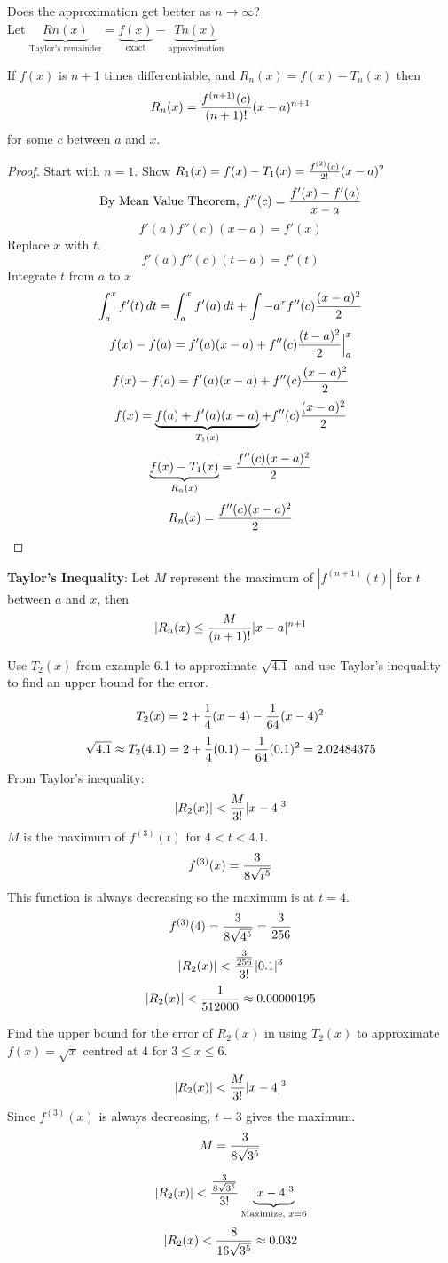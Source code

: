 \documentclass[english, 12pt]{article}
\begin{document}
\begin{asd}
Does the approximation get better as $n \to \infty$?\\
Let $\underbrace{Rn(x)}_{\text{Taylor's remainder}} = \underbrace{f(x)}_{\text{exact}} - \underbrace{Tn(x)}_{\text{approximation}}$
\begin{thrm}
If $f(x)$ is $n+1$ times differentiable, and 
$R_{n} (x) = f(x) - T_{n} (x)$ then
\[ R_{n} (x) = \frac{f^{(n+1)} (c)}{(n+1)!} (x-a)^{n+1}\]
for some $c$ between $a$ and $x$.
\begin{proof}
Start with $n=1$. Show $R_{1} (x) = f(x) - T_{1} (x) = \frac{f^{(2)} (c)}{2!} (x-a)^2$
\[\text{By Mean Value Theorem, } f''(c) = \frac{f'(x) - f'(a)}{x-a}\]
\[f'(a) f''(c) (x-a) = f'(x)\]
Replace $x$ with $t$.
\[f'(a) f''(c) (t-a) = f'(t)\]
Integrate $t$ from $a$ to $x$
\[\int_a^x f'(t)\,dt = \int_a^x f'(a)\,dt + \int-a^x f''(c) \frac{(x-a)^2}{2}\]
\[f(x) - f(a) = f'(a) (x-a) + f''(c) \frac{(t-a)^2}{2} \Big|_a^x\]
\[f(x) - f(a) = f'(a)(x-a) + f''(c) \frac{(x-a)^2}{2}\]
\[f(x) = \underbrace{f(a) + f'(a)(x-a)}_{T_{1} (x)} + f''(c) \frac{(x-a)^2}{2}\]
\[ \underbrace{f(x) - T_{1} (x)}_{R_{n} (x)} = \frac{f''(c) (x-a)^2}{2}\]
\[ R_{n} (x) = \frac{f''(c) (x-a)^2}{2}\]
\end{proof}
\end{thrm}
\end{asd}
\begin{thrm}
\textbf{Taylor's Inequality}: Let $M$ represent the maximum of $|f^{(n+1)} (t) |$ for $t$ between $a$ and $x$, then
\[|R_{n} (x) \leq \frac{M}{(n+1)!} |x-a|^{n+1}\]
\end{thrm}
\begin{exmp}
Use $T_{2} (x)$ from example 6.1 to approximate $\sqrt{4.1}$ and use Taylor's inequality to find an upper bound for the error.
\begin{sol}
\[T_{2} (x) = 2 + \frac{1}{4} (x-4) - \frac{1}{64} (x-4)^2\]
\[ \sqrt{4.1} \approx T_{2} (4.1) =  2 + \frac{1}{4} (0.1) - \frac{1}{64} (0.1)^2 = 2.02484375\]
From Taylor's inequality:
\[ |R_{2} (x) | < \frac{M}{3!} |x-4|^3\]
$M$ is the maximum of $f^{(3)} (t)$ for $ 4 < t < 4.1$.
\[ f^{(3)} (x) = \frac{3}{8 \sqrt{t^5}}\]
This function is always decreasing so the maximum is at $t = 4$.
\[f^{(3)} (4) = \frac{3}{8\sqrt{4^5}} = \frac{3}{256}\]
\[|R_{2} (x) | < \frac{\frac{3}{256}}{3!} |0.1|^3\]
\[ |R_{2} (x) | < \frac{1}{512000} \approx 0.00000195\]
\end{sol}
\end{exmp}
\begin{exmp}
Find the upper bound for the error of $R_{2}(x)$ in using $T_{2} (x)$ to approximate $f(x) = \sqrt{x}$ centred at $4$ for $3 \leq x \leq 6$.
\begin{sol}
\[ |R_{2} (x) | < \frac{M}{3!} | x-4 |^3\]
Since $f^{(3)} (x)$ is always decreasing, $t=3$ gives the maximum.
\[M = \frac{3}{8 \sqrt{3^5}}\]

\[|R_{2} (x)| < \frac{\frac{3}{8 \sqrt{3^5}}}{3!} \underbrace{| x-4 |^3}_{\text{Maximize, } x = 6}\]
\[ |R_{2} (x) < \frac{8}{16 \sqrt{3^5}} \approx 0.032\] 
\end{sol}
\end{exmp}
\end{document}
